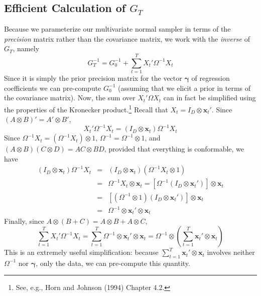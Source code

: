 \documentclass[12pt]{article}
\begin{document}
\subsection{Efficient Calculation of $G_T$}
Because we parameterize our multivariate normal sampler in terms of the \emph{precision} matrix rather than the covariance matrix, we work with the \emph{inverse} of $G_T$, namely
\begin{equation*}
  G_T^{-1} =  G_0^{-1} + \sum_{t=1}^T X_t' \Omega^{-1} X_t 
\end{equation*}
Since it is simply the prior precision matrix for the vector $\boldsymbol{\gamma}$ of regression coefficients we can pre-compute $G_0^{-1}$ (assuming that we elicit a prior in terms of the covariance matrix).
Now, the sum over $X_t' \Omega X_t$ can in fact be simplified using the properties of the Kronecker product.\footnote{See, e.g., Horn and Johnson (1994) Chapter 4.2.}
Recall that $X_t = I_D \otimes \mathbf{x}_t'$.
Since $\left( A\otimes B \right)' = A' \otimes B'$, 
\begin{equation*}
  X_t' \Omega^{-1} X_t = \left( I_D \otimes \mathbf{x}_t \right) \Omega^{-1}X_t
\end{equation*}
Since $\Omega^{-1}X_t = \left( \Omega^{-1}X_t \right) \otimes 1$, $\Omega^{-1} = \Omega^{-1}\otimes 1$, and $(A \otimes B)(C \otimes D) = AC \otimes BD$, provided that everything is conformable, we have
\begin{eqnarray*}
  \left( I_D \otimes \mathbf{x}_t \right) \Omega^{-1}X_t &=&  \left( I_D \otimes \mathbf{x}_t \right) (\Omega^{-1}X_t \otimes 1)\\
  &=&  \Omega^{-1} X_t \otimes \mathbf{x}_t = \left[\Omega^{-1} (I_D \otimes \mathbf{x}_t') \right]\otimes \mathbf{x}_t \\
  &=& \left[(\Omega^{-1} \otimes 1)(I_D \otimes \mathbf{x}_t') \right]\otimes \mathbf{x}_t \\
  &=& \Omega^{-1} \otimes \mathbf{x}_t' \otimes \mathbf{x}_t
\end{eqnarray*}
Finally, since  $A \otimes (B + C) = A\otimes B + A \otimes C$,
\begin{equation*}
  \sum_{t=1}^{T} X_t' \Omega^{-1} X_t = \sum_{t=1}^{T} \Omega^{-1} \otimes \mathbf{x}_t' \otimes \mathbf{x}_t = \Omega^{-1} \otimes \left(\sum_{t=1}^T  \mathbf{x}_t' \otimes \mathbf{x}_t \right)
\end{equation*}
This is an extremely useful simplification: because $\sum_{t=1}^T  \mathbf{x}_t' \otimes \mathbf{x}_t$ involves neither $\Omega^{-1}$ nor $\boldsymbol{\gamma}$, only the data, we can pre-compute this quantity.
\end{document}
